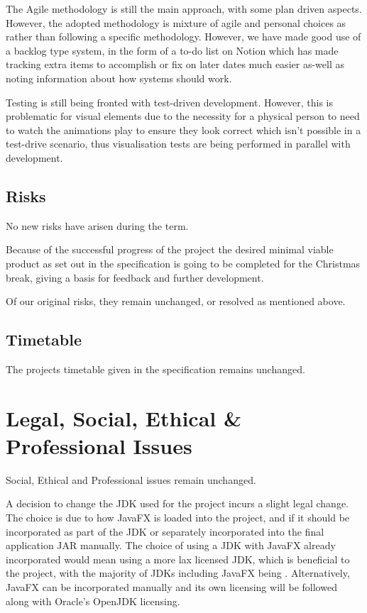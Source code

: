 \documentclass[a4paper,fleqn,twoside,12pt]{article}
\begin{document}
The Agile \cite{atlassian_2022_agile} methodology is still the main approach, with some plan driven aspects. However, the adopted methodology is mixture of agile and personal choices as rather than following a specific methodology. However, we have made good use of a backlog type system, in the form of a to-do list on Notion which has made tracking extra items to accomplish or fix on later dates much easier as-well as noting information about how systems should work.

Testing is still being fronted with test-driven development. However, this is problematic for visual elements due to the necessity for a physical person to need to watch the animations play to ensure they look correct which isn't possible in a test-drive scenario, thus visualisation tests are being performed in parallel with development.

\subsection{Risks}
No new risks have arisen during the term.

Because of the successful progress of the project the desired minimal viable product as set out in the specification is going to be completed for the Christmas break, giving a basis for feedback and further development.

Of our original risks, they remain unchanged, or resolved as mentioned above.

\subsection{Timetable}
The projects timetable given in the specification \cite{hollowell_2022_visual} remains unchanged.

\section{Legal, Social, Ethical \& Professional Issues}
Social, Ethical and Professional issues remain unchanged.

A decision to change the JDK used for the project incurs a slight legal change. The choice is due to how JavaFX is loaded into the project, and if it should be incorporated as part of the JDK or separately incorporated into the final application JAR manually. The choice of using a JDK with JavaFX already incorporated would mean using a more lax licensed JDK, which is beneficial to the project, with the majority of JDKs including JavaFX being . Alternatively, JavaFX can be incorporated manually and its own licensing will be followed along with Oracle's OpenJDK \cite{oraclecorporation_2022_openjdk} licensing.




\printbibliography
\end{document}
